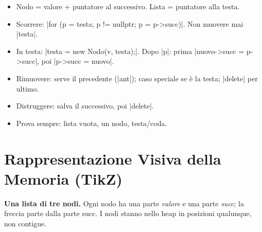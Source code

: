 \begin{inparole}
\begin{itemize}
  \item Nodo = valore + puntatore al successivo. Lista = puntatore alla testa.
  \item Scorrere: \cc|for (p = testa; p != nullptr; p = p->succ)|. Non muovere mai \cc|testa|.
  \item In testa: \cc|testa = new Nodo(v, testa);|. Dopo \cc|p|: prima
        \cc|nuovo->succ = p->succ|, poi \cc|p->succ = nuovo|.
  \item Rimuovere: serve il precedente (\cc|ant|); caso speciale se è la testa;
        \cc|delete| per ultimo.
  \item Distruggere: salva il successivo, poi \cc|delete|.
  \item Prova sempre: lista vuota, un nodo, testa/coda.
\end{itemize}
\end{inparole}

\section{Rappresentazione Visiva della Memoria (TikZ)}

\textbf{Una lista di tre nodi.} Ogni nodo ha una parte \emph{valore} e una parte
\emph{succ}; la freccia parte dalla parte succ. I nodi stanno nello heap in posizioni
qualunque, non contigue.
\begin{center}
\end{center}

